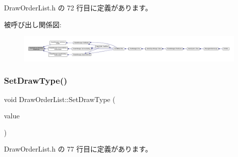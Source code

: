  Draw\+Order\+List.\+h の 72 行目に定義があります。

被呼び出し関係図\+:
\nopagebreak
\begin{figure}[H]
\begin{center}
\leavevmode
\includegraphics[width=350pt]{class_draw_order_list_a6533ffbf1cd3f27583e0de8a08648b75_icgraph}
\end{center}
\end{figure}
\mbox{\label{class_draw_order_list_a5b3ff99f9297293edc057b95d23e8f2d}} 
\subsubsection{\texorpdfstring{Set\+Draw\+Type()}{SetDrawType()}}
{\footnotesize\ttfamily void Draw\+Order\+List\+::\+Set\+Draw\+Type (\begin{DoxyParamCaption}\item[{\mbox{\hyperlink{class_draw_order_list_a6c9b9ceb312c16d399ef355f4f3486bb}{Draw\+Type}}}]{value }\end{DoxyParamCaption})\hspace{0.3cm}{\ttfamily [inline]}}



 Draw\+Order\+List.\+h の 77 行目に定義があります。

